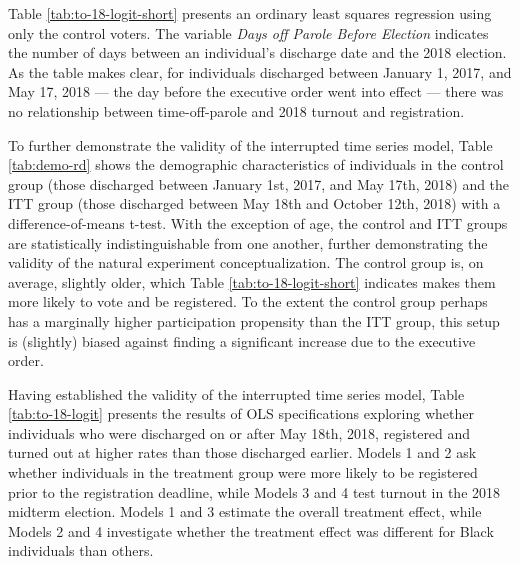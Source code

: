 \documentclass[
  12pt,
]{article}
\begin{document}
Table \ref{tab:to-18-logit-short} presents an ordinary least squares regression using only the control voters. The variable \emph{Days off Parole Before Election} indicates the number of days between an individual's discharge date and the 2018 election. As the table makes clear, for individuals discharged between January 1, 2017, and May 17, 2018 --- the day before the executive order went into effect --- there was no relationship between time-off-parole and 2018 turnout and registration.

\begin{singlespace}


\end{singlespace}

To further demonstrate the validity of the interrupted time series model, Table \ref{tab:demo-rd} shows the demographic characteristics of individuals in the control group (those discharged between January 1st, 2017, and May 17th, 2018) and the ITT group (those discharged between May 18th and October 12th, 2018) with a difference-of-means t-test. With the exception of age, the control and ITT groups are statistically indistinguishable from one another, further demonstrating the validity of the natural experiment conceptualization. The control group is, on average, slightly older, which Table \ref{tab:to-18-logit-short} indicates makes them more likely to vote and be registered. To the extent the control group perhaps has a marginally higher participation propensity than the ITT group, this setup is (slightly) biased against finding a significant increase due to the executive order.

\begin{singlespace}


\end{singlespace}

Having established the validity of the interrupted time series model, Table \ref{tab:to-18-logit} presents the results of OLS specifications exploring whether individuals who were discharged on or after May 18th, 2018, registered and turned out at higher rates than those discharged earlier. Models 1 and 2 ask whether individuals in the treatment group were more likely to be registered prior to the registration deadline, while Models 3 and 4 test turnout in the 2018 midterm election. Models 1 and 3 estimate the overall treatment effect, while Models 2 and 4 investigate whether the treatment effect was different for Black individuals than others.
\end{document}
